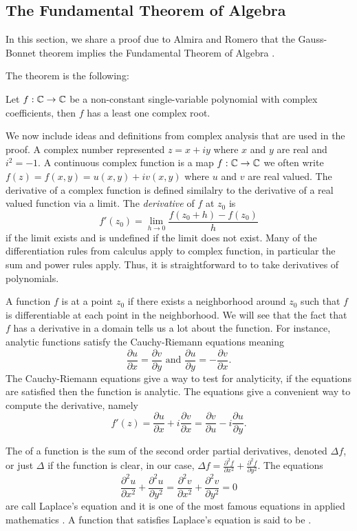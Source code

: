 \subsection{The Fundamental Theorem of Algebra}
\label{sec:fta}

In this section, we share a proof due to Almira and Romero that
the Gauss-Bonnet theorem implies the
Fundamental Theorem of Algebra \cite{almira_yet_2007}.


The theorem is the following:
\begin{theorem}\label{thm:fta}
	Let $f:\mathbb{C} \to \mathbb{C}$ be a non-constant single-variable polynomial with complex coefficients,
	then $f$ has a least one complex root.
\end{theorem}


We now include ideas and definitions from complex analysis that are used
in the proof. 
A complex number represented $z=x+iy$ where $x$ and $y$ are real
and $i^2=-1.$
A continuous complex function is a map $f:\mathbb{C}\to \mathbb{C}$ we often write
 $f(z)=f(x,y)=u(x,y)+iv(x,y)$ where $u$ and $v$ are real valued.
The derivative of a complex function is defined similalry to the derivative of a real valued
function via a limit. The \emph{derivative} of $f$ at $z_0$ is
$$f'(z_0)=\lim_{h\to 0} \frac{f(z_0+h)-f(z_0)}{h}$$
if the limit exists and is undefined if the limit does not exist.
Many of the differentiation rules from calculus apply to complex function,
in particular the sum and power rules apply. Thus, it is straightforward to 
to take derivatives of polynomials.


A function $f$ is  at a point $z_0$ if there exists a neighborhood around $z_0$ 
such that $f$ is differentiable at each point in the neighborhood.
We will see that the fact that $f$ has a derivative in a domain tells
us a lot about the function. For instance, analytic functions satisfy the Cauchy-Riemann 
equations meaning
$$\frac{\partial u}{\partial x}=\frac{\partial v}{\partial y} \textrm{ and } \frac{\partial u}{\partial y}=- \frac{\partial v}{\partial x}.$$
The Cauchy-Riemann equations give a way to test for analyticity, if the equations
are satisfied then the function is analytic.
The equations give a convenient way to compute the derivative, namely
$$f'(z)=\frac{\partial u}{\partial x} +i \frac{\partial v}{\partial x} =\frac{\partial v}{\partial u} -i \frac{\partial u}{\partial y}.$$


The  of a function is the sum of the second order partial derivatives, denoted $\Delta f$,
or just $\Delta$ if the function is clear,
in our case, $\Delta f=\frac{\partial^2 f}{\partial x^2}+\frac{\partial^2 f}{\partial y^2}$.
The equations $$\frac{\partial^2 u}{\partial x^2}+\frac{\partial^2 u}{\partial y^2}=
\frac{\partial^2 v}{\partial x^2}+\frac{\partial^2 v}{\partial y^2}=0$$
are call Laplace's equation and it is one of the most famous equations in applied mathematics
\cite{zill_first_2008}.
A function that satisfies Laplace's equation is said to be .

